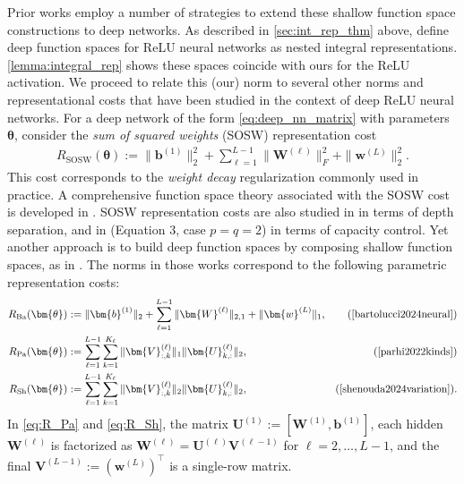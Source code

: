 \documentclass{article}
\def\vtheta{{\bm{\theta}}}
\def\vb{{\bm{b}}}
\def\vw{{\bm{w}}}
\def\mU{{\bm{U}}}
\def\mV{{\bm{V}}}
\def\mW{{\bm{W}}}
\begin{document}
Prior works employ a number of strategies to extend these shallow function space constructions to deep networks. As described in \cref{sec:int_rep_thm} above, \cite{wojtowytsch2020banach} define deep function spaces for ReLU neural networks as nested integral representations.  \cref{lemma:integral_rep} shows these spaces coincide with ours for the ReLU activation. We proceed to relate this (our) norm to several other norms and representational costs that have been studied in the context of deep ReLU neural networks. For a deep network of the form \eqref{eq:deep_nn_matrix} with parameters $\vtheta$, consider the \textit{sum of squared weights} (SOSW) representation cost
\begin{align} \label{eq:sosw}
    R_{\mathrm{SOSW}}(\vtheta)
    := \| \vb^{(1)} \|_2^2 + \sum_{\ell=1}^{L-1} \| \mW^{(\ell)} \|_F^2
    +
    \| \vw^{(L)} \|_2^2 .
\end{align}
This cost corresponds to the \textit{weight decay} regularization commonly used in practice. A comprehensive function space theory associated with the SOSW cost is developed in \cite{ongie2026representation}. SOSW representation costs are also studied in \cite{parkinson2024depth} in terms of depth separation, and in \cite{neyshabur2015norm} (Equation 3, case $p = q = 2$) in terms of capacity control. Yet another approach is to build deep function spaces by composing shallow function spaces, as in \cite{bartolucci2024neural,parhi2022kinds,shenouda2024variation}. The norms in those works correspond to the following parametric representation costs:
\begin{align}
    R_{\mathrm{Ba}} (\vtheta) &:= \| \vb^{(1)} \|_2 + \sum_{\ell=1}^{L-1} \| \mW^{(\ell)} \|_{2,1} +  \| \vw^{(L)} \|_1, &\textrm{(\cite{bartolucci2024neural})} \label{eq:R_Ba} \\
    R_{\mathrm{Pa}} (\vtheta) &:=  \sum_{\ell=1}^{L-1} \sum_{k=1}^{K_\ell} 
    \| \mV^{(\ell)}_{:,k} \|_1 \| \mU^{(\ell)}_{k,:} \|_2, &\textrm{(\cite{parhi2022kinds})} \label{eq:R_Pa} \\
    R_{\mathrm{Sh}} (\vtheta) &:=  \sum_{\ell=1}^{L-1} \sum_{k=1}^{K_\ell} 
    \| \mV^{(\ell)}_{:,k} \|_2 \| \mU^{(\ell)}_{k,:} \|_2, &\textrm{(\cite{shenouda2024variation})}. \label{eq:R_Sh}
\end{align}
In \eqref{eq:R_Pa} and \eqref{eq:R_Sh}, the matrix $\mU^{(1)} := [\mW^{(1)}, \vb^{(1)}]$, each hidden $\mW^{(\ell)}$ is factorized as $\mW^{(\ell)} = \mU^{(\ell)} \mV^{(\ell-1)}$ for $\ell=2, \dots, L-1$, and the final $\mV^{(L-1)} := (\vw^{(L)})^\top$ is a single-row matrix. 
\end{document}
